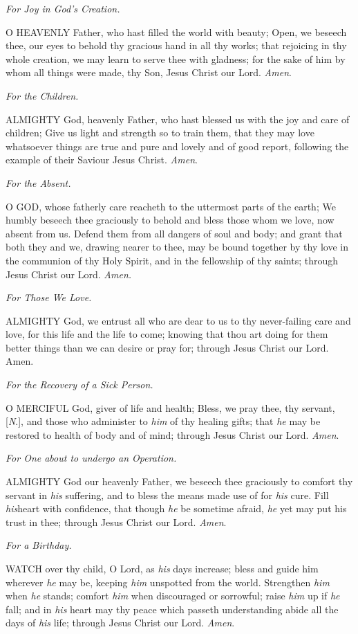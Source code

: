 \emph{For
Joy in God's Creation.}

O
HEAVENLY Father, who hast filled the world with beauty; Open, we beseech
thee, our eyes to behold thy gracious hand in all thy works; that rejoicing
in thy whole creation, we may learn to serve thee with gladness; for the
sake of him by whom all things were made, thy Son, Jesus Christ our Lord.
\emph{Amen}.

\emph{For
the Children.}

ALMIGHTY
God, heavenly Father, who hast blessed us with the joy and care of children;
Give us light and strength so to train them, that they may love whatsoever
things are true and pure and lovely and of good report, following the
example of their Saviour Jesus Christ. \emph{Amen}.

\emph{For
the Absent.}

O
GOD, whose fatherly care reacheth to the uttermost parts of the earth;
We humbly beseech thee graciously to behold and bless those whom we love,
now absent from us. Defend them from all dangers of soul and body; and
grant that both they and we, drawing nearer to thee, may be bound together
by thy love in the communion of thy Holy Spirit, and in the fellowship
of thy saints; through Jesus Christ our Lord. \emph{Amen.}

\emph{For
Those We Love.}

ALMIGHTY
God, we entrust all who are dear to us to thy never-failing care and love,
for this life and the life to come; knowing that thou art doing for them
better things than we can desire or pray for; through Jesus Christ our
Lord. Amen.

\emph{For
the Recovery of a Sick Person.}

O
MERCIFUL God, giver of life and health; Bless, we pray thee, thy servant,
[\emph{N}.], and those who administer to \emph{him} of thy healing
gifts; that \emph{he} may be restored to health of body and of mind;
through Jesus Christ our Lord. \emph{Amen}.

\emph{For
One about to undergo an Operation.}

ALMIGHTY
God our heavenly Father, we beseech thee graciously to comfort thy servant
in \emph{his} suffering, and to bless the means made use of for \emph{his}
cure. Fill \emph{his}heart with confidence, that though \emph{he}
be sometime afraid, \emph{he} yet may put his trust in thee; through
Jesus Christ our Lord. \emph{Amen}.

\emph{For
a Birthday.}

WATCH
over thy child, O Lord, as \emph{his} days increase; bless and guide
him wherever \emph{he} may be, keeping \emph{him} unspotted from the
world. Strengthen \emph{him} when \emph{he} stands; comfort \emph{him}
when discouraged or sorrowful; raise \emph{him} up if \emph{he} fall;
and in \emph{his} heart may thy peace which passeth understanding abide
all the days of \emph{his} life; through Jesus Christ our Lord. \emph{Amen}.

